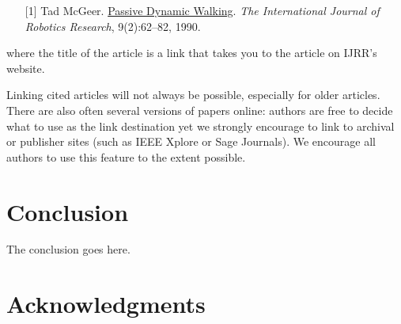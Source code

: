 \documentclass[conference]{IEEEtran}
\begin{document}
\def\tmplabel#1{[#1]}

\begin{enumerate}
\item[\tmplabel{1}] Tad McGeer. \href{http://ijr.sagepub.com/content/9/2/62.abstract}{Passive Dynamic
Walking}. {\em The International Journal of Robotics Research}, 9(2):62--82,
1990.
\end{enumerate}
%
where the title of the article is a link that takes you to the article on IJRR's website. 


Linking cited articles will not always be possible, especially for
older articles. There are also often several versions of papers
online: authors are free to decide what to use as the link destination
yet we strongly encourage to link to archival or publisher sites
(such as IEEE Xplore or Sage Journals).  We encourage all authors to use this feature to
the extent possible.

\section{Conclusion} 
\label{sec:conclusion}

The conclusion goes here.

\section*{Acknowledgments}




\end{document}

